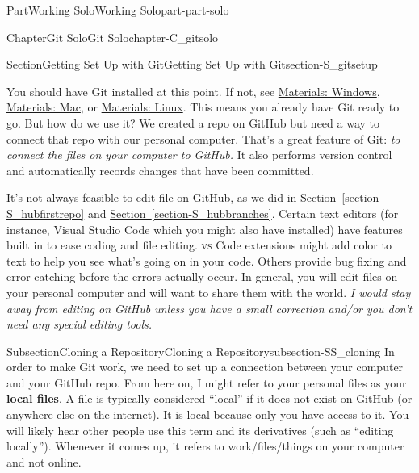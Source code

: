 \documentclass[oneside,10pt,]{book}
\newcommand{\xreffont}{\relax}
\newcommand{\initialism}[1]{\textsc{\MakeLowercase{#1}}}
\newcommand{\terminology}[1]{\textbf{#1}}
\begin{document}
\begin{partptx}{Part}{Working Solo}{}{Working Solo}{}{}{part-part-solo}
\begin{chapterptx}{Chapter}{Git Solo}{}{Git Solo}{}{}{chapter-C_gitsolo}
\begin{introduction}{}
\end{introduction}%
%
%
\typeout{************************************************}
\typeout{************************************************}
%
\begin{sectionptx}{Section}{Getting Set Up with Git}{}{Getting Set Up with Git}{}{}{section-S_gitsetup}
%
%
\begin{introduction}{}%
You should have Git installed at this point. If not, see \hyperref[preface-materials-windows]{Materials: Windows}, \hyperref[preface-materials-mac]{Materials: Mac}, or \hyperref[preface-materials-linux]{Materials: Linux}. This means you already have Git ready to go. But how do we use it? We created a repo on GitHub but need a way to connect that repo with our personal computer. That's a great feature of Git: \emph{to connect the files on your computer to GitHub.} It also performs version control and automatically records changes that have been committed.%
\par
It's not always feasible to edit file on GitHub, as we did in \hyperref[section-S_hubfirstrepo]{Section~{\xreffont\ref{section-S_hubfirstrepo}}} and \hyperref[section-S_hubbranches]{Section~{\xreffont\ref{section-S_hubbranches}}}. Certain text editors (for instance, Visual Studio Code which you might also have installed) have features built in to ease coding and file editing. \initialism{VS} Code extensions might add color to text to help you see what's going on in your code. Others provide bug fixing and error catching before the errors actually occur. In general, you will edit files on your personal computer and will want to share them with the world. \emph{I would stay away from editing on GitHub unless you have a small correction and\slash{}or you don't need any special editing tools.}%
\end{introduction}%
%
%
\typeout{************************************************}
\typeout{************************************************}
%
\begin{subsectionptx}{Subsection}{Cloning a Repository}{}{Cloning a Repository}{}{}{subsection-SS_cloning}
%
%
%
%
%
In order to make Git work, we need to set up a connection between your computer and your GitHub repo. From here on, I might refer to your personal files as your \terminology{local files}. A file is typically considered ``local'' if it does not exist on GitHub (or anywhere else on the internet). It is local because only you have access to it. You will likely hear other people use this term and its derivatives (such as ``editing locally''). Whenever it comes up, it refers to work\slash{}files\slash{}things on your computer and not online.%

\end{subsectionptx}
\end{sectionptx}
\end{chapterptx}
\end{partptx}
\end{document}
